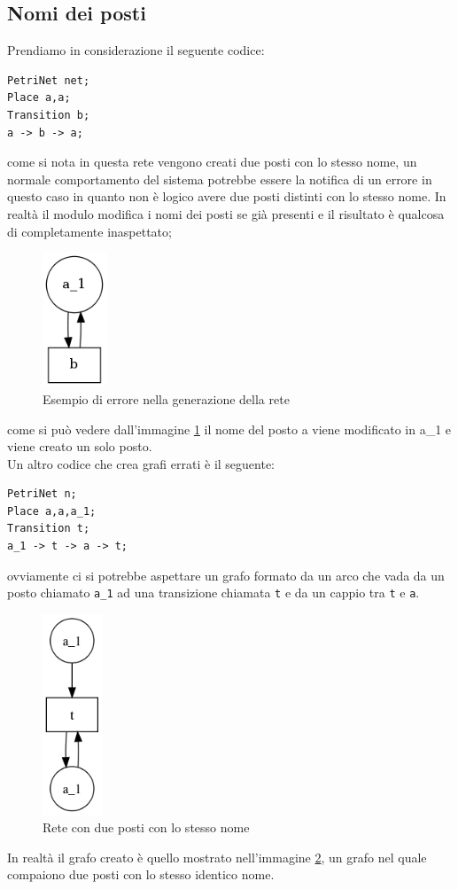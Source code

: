 \documentclass[italian,12pt]{book}
\begin{document}
\subsection{Nomi dei posti}
Prendiamo in considerazione il seguente codice:
\begin{verbatim}PetriNet net;
Place a,a;
Transition b;
a -> b -> a;
\end{verbatim}
come si nota in questa rete vengono creati due posti con lo stesso nome, un normale comportamento del sistema
potrebbe essere la notifica di un errore in questo caso in quanto non è logico avere 
due posti distinti con lo stesso nome. In realtà il modulo modifica i nomi dei posti se già presenti e il risultato
è qualcosa di completamente inaspettato;
\begin{figure}[htb]
\centerline{\includegraphics[height=4cm]{img/posti1.png}}
\caption{Esempio di errore nella generazione della rete}\label{fig:err_gen_rete}
\end{figure}
come si può vedere dall'immagine \ref{fig:err_gen_rete} il nome del posto a viene modificato in a\_1 e viene creato un solo
posto.\\
Un altro codice che crea grafi errati è il seguente:
\begin{verbatim}PetriNet n;
Place a,a,a_1;
Transition t;
a_1 -> t -> a -> t;
\end{verbatim}
ovviamente ci si potrebbe aspettare un grafo formato da un arco che vada da un posto chiamato
{\tt a\_1} ad una transizione chiamata {\tt t} e da un cappio tra {\tt t} e {\tt a}.
\begin{figure}[htb]
\centerline{\includegraphics[height=6cm]{img/posti2.png}}
\caption{Rete con due posti con lo stesso nome}\label{fig:err_gen_rete_posti2}
\end{figure}
In realtà il grafo creato è quello mostrato nell'immagine \ref{fig:err_gen_rete_posti2}, un grafo
nel quale compaiono due posti con lo stesso identico nome.
\end{document}
